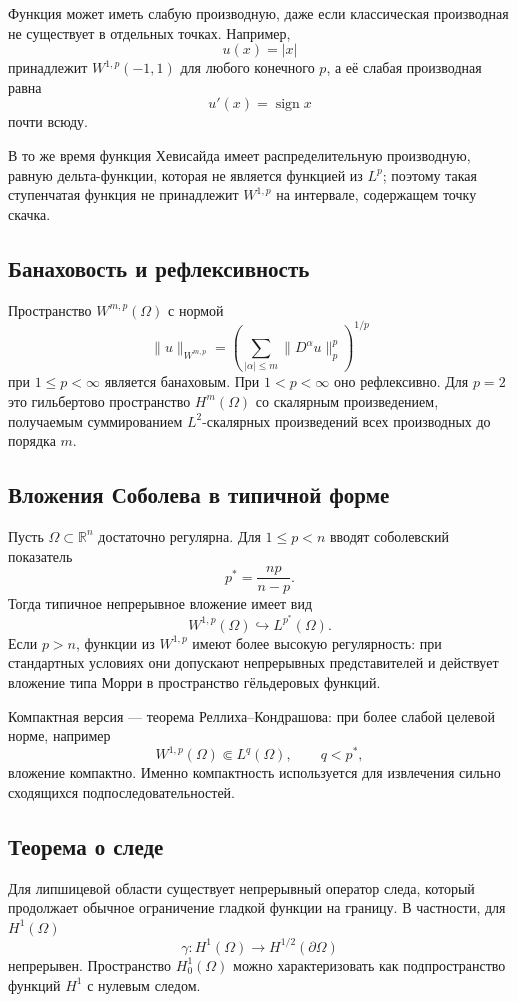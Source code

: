 Функция может иметь слабую производную, даже если классическая производная не
существует в отдельных точках. Например,
\[
    u(x)=|x|
\]
принадлежит $W^{1,p}(-1,1)$ для любого конечного $p$, а её слабая производная равна
\[
    u'(x)=\operatorname{sign}x
\]
почти всюду.

В то же время функция Хевисайда имеет распределительную производную, равную дельта-функции,
которая не является функцией из $L^p$; поэтому такая ступенчатая функция не принадлежит
$W^{1,p}$ на интервале, содержащем точку скачка.

\subsection{Банаховость и рефлексивность}

Пространство $W^{m,p}(\Omega)$ с нормой
\[
\|u\|_{W^{m,p}}=
\left(\sum_{|\alpha|\le m}\|D^\alpha u\|_p^p\right)^{1/p}
\]
при $1\le p<\infty$ является банаховым. При $1<p<\infty$ оно рефлексивно.
Для $p=2$ это гильбертово пространство $H^m(\Omega)$ со скалярным произведением,
получаемым суммированием $L^2$-скалярных произведений всех производных до порядка
$m$.

\subsection{Вложения Соболева в типичной форме}

Пусть $\Omega\subset\mathbb R^n$ достаточно регулярна. Для $1\le p<n$ вводят
соболевский показатель
\[
    p^*=\frac{np}{n-p}.
\]
Тогда типичное непрерывное вложение имеет вид
\[
    W^{1,p}(\Omega)\hookrightarrow L^{p^*}(\Omega).
\]
Если $p>n$, функции из $W^{1,p}$ имеют более высокую регулярность: при стандартных
условиях они допускают непрерывных представителей и действует вложение типа Морри
в пространство гёльдеровых функций.

Компактная версия --- теорема Реллиха--Кондрашова: при более слабой целевой норме,
например
\[
    W^{1,p}(\Omega)\Subset L^q(\Omega),\qquad q<p^*,
\]
вложение компактно. Именно компактность используется для извлечения сильно
сходящихся подпоследовательностей.

\subsection{Теорема о следе}

Для липшицевой области существует непрерывный оператор следа, который продолжает
обычное ограничение гладкой функции на границу. В частности, для $H^1(\Omega)$
\[
    \gamma:H^1(\Omega)\to H^{1/2}(\partial\Omega)
\]
непрерывен. Пространство $H_0^1(\Omega)$ можно характеризовать как подпространство
функций $H^1$ с нулевым следом.

